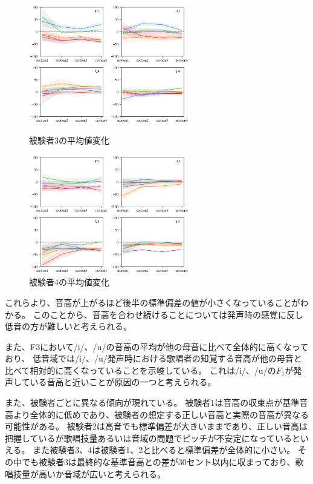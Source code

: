 \documentclass[10.5ptj,a4j,dvipdfmx,uplatex, oneside, openany, report]{jsbook}%
\begin{document}
\begin{figure}[thbp]
    \begin{minipage}{0.5\hsize}
        \begin{center}
            \includegraphics[clip,width=7.0cm]{long_mean_3.png}
          \end{center}
     \caption{被験者3の平均値変化}
     \label{long_mean_3}
    \end{minipage}
    \begin{minipage}{0.5\hsize}
        \begin{center}
            \includegraphics[clip,width=7.0cm]{long_mean_4.png}
          \end{center}
     \caption{被験者4の平均値変化}
     \label{long_mean_4}
    \end{minipage}
\end{figure}

これらより、音高が上がるほど後半の標準偏差の値が小さくなっていることがわかる。
このことから、音高を合わせ続けることについては発声時の感覚に反し低音の方が難しいと考えられる。

また、F3において/i/、/u/の音高の平均が他の母音に比べて全体的に高くなっており、
低音域では/i/、/u/発声時における歌唱者の知覚する音高が他の母音と比べて相対的に高くなっていることを示唆している。
これは/i/、/u/の$F_1$が発声している音高と近いことが原因の一つと考えられる。

また、被験者ごとに異なる傾向が現れている。
被験者1は音高の収束点が基準音高より全体的に低めであり、被験者の想定する正しい音高と実際の音高が異なる可能性がある。
被験者2は高音でも標準偏差が大きいままであり、正しい音高は把握しているが歌唱技量あるいは音域の問題でピッチが不安定になっているといえる。
また被験者3、4は被験者1、2と比べると標準偏差が全体的に小さい。
その中でも被験者3は最終的な基準音高との差が30セント以内に収まっており、歌唱技量が高いか音域が広いと考えられる。
\end{document}
